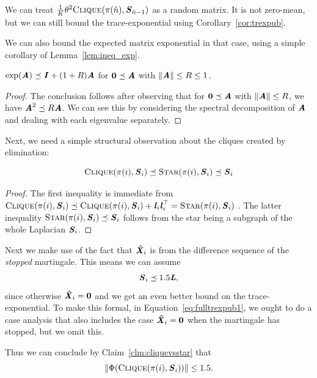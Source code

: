 We can treat
$\frac{1}{K}\theta^2\vcliq{\pi(\hat{n})}{\SS_{\hat{n}-1}}$ as a random
matrix.
It is not zero-mean, but we can still bound the trace-exponential
using Corollary~\ref{cor:trexpub}.

We can also bound the expected matrix exponential in
that case, using a simple corollary of Lemma~\ref{lem:ineq_exp}.
\begin{corollary}\label{cor:ineq_exp_cher}
  $\exp(\AA) \preceq \II + (1+R)\AA $
  for $\matzero \preceq \AA$ with $\norm{\AA} \leq R \leq 1$.
\end{corollary}
\begin{proof}
  The conclusion follows after observing that for $\matzero \preceq \AA$ with $\norm{\AA} \leq R$,
  we have $\AA^2 \preceq R \AA$.
  We can see this by considering the spectral decomposition of $\AA$
  and dealing with each eigenvalue separately.
\end{proof}

Next, we need a simple structural observation about the cliques
created by elimination:
\begin{claim}
  \label{clm:cliquevsstar}
  \[
    \vcliq{\pi(i)}{\SS_i} \preceq \vstar{\pi(i)}{\SS_i} \preceq \SS_i
  \]
\end{claim}
\begin{proof}
  The first inequality is immediate from
  $
     \vcliq{\pi(i)}{\SS_i} \preceq   \vcliq{\pi(i)}{\SS_i} + \ll_i\ll_i^\trp
     =
     \vstar{\pi(i)}{\SS_i}
   $
   .
   The latter inequality $\vstar{\pi(i)}{\SS_i} \preceq \SS_i$
  follows from the star being a subgraph of the whole Laplacian $\SS_i$.
\end{proof}

Next we make use of the fact that $\XXtil_{i}$ is from the
difference sequence of the \emph{stopped} martingale.
This means we can assume
\[
  \SS_{i} \preceq 1.5 \LL,
\]
since
otherwise $\XXtil_{i} = \matzero$ and we get an even better
bound on the trace-exponential.
To make this formal, in Equation~\eqref{eq:fulltrexpub1},
we ought to do a case analysis that also includes
the case $\XXtil_{i} = \matzero$ when the martingale has
stopped, but we omit this.

Thus we can conclude by Claim~\ref{clm:cliquevsstar} that
\[
  \norm{\Phi(\vcliq{\pi(i)}{\SS_{i}})} \leq 1.5.
\]

